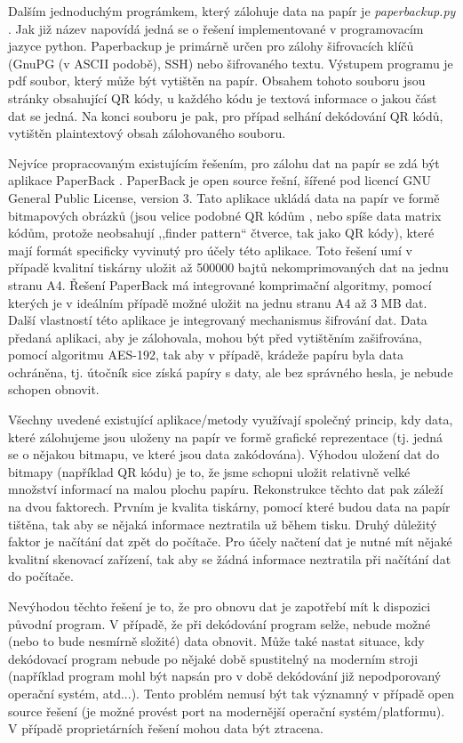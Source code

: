 \documentclass[conference]{IEEEtran}
\begin{document}
Dalším jednoduchým prográmkem, který zálohuje data na papír je \emph{paperbackup.py} \cite{PaperBackup}. Jak již název napovídá jedná se o řešení implementované v programovacím jazyce python. Paperbackup je primárně určen pro zálohy šifrovacích klíčů (GnuPG (v ASCII podobě), SSH) nebo šifrovaného textu. Výstupem programu je pdf soubor, který může být vytištěn na papír. Obsahem tohoto souboru jsou stránky obsahující QR kódy, u každého kódu je textová informace o jakou část dat se jedná. Na konci souboru je pak, pro případ selhání dekódování QR kódů, vytištěn plaintextový obsah zálohovaného souboru. 

Nejvíce propracovaným existujícím řešením, pro zálohu dat na papír se zdá být aplikace PaperBack \cite{PaperBak}. PaperBack je open source řešní, šířené pod licencí GNU General Public License, version 3. Tato aplikace ukládá data na papír ve formě bitmapových obrázků (jsou velice podobné QR kódům \cite{ScanningQrCodes}, nebo spíše data matrix kódům, protože neobsahují ,,finder pattern`` čtverce, tak jako QR kódy), které mají formát specificky vyvinutý pro účely této aplikace. Toto řešení umí v případě kvalitní tiskárny uložit až 500000 bajtů nekomprimovaných dat na jednu stranu A4. Řešení PaperBack má integrované komprimační algoritmy, pomocí kterých je v ideálním případě možné uložit na jednu stranu A4 až 3 MB dat. Další vlastností této aplikace je integrovaný mechanismus šifrování dat. Data předaná aplikaci, aby je zálohovala, mohou být před vytištěním zašifrována, pomocí algoritmu AES-192, tak aby v případě, krádeže papíru byla data ochráněna, tj. útočník sice získá papíry s daty, ale bez správného hesla, je nebude schopen obnovit.

Všechny uvedené existující aplikace/metody využívají společný princip, kdy data, které zálohujeme jsou uloženy na papír ve formě grafické reprezentace (tj. jedná se o nějakou bitmapu, ve které jsou data zakódována). Výhodou uložení dat do bitmapy (například QR kódu) je to, že jsme schopni uložit relativně velké množství informací na malou plochu papíru. Rekonstrukce těchto dat pak záleží na dvou faktorech. Prvním je kvalita tiskárny, pomocí které budou data na papír tištěna, tak aby se nějaká informace neztratila už během tisku. Druhý důležitý faktor je načítání dat zpět do počítače. Pro účely načtení dat je nutné mít nějaké kvalitní skenovací zařízení, tak aby se žádná informace neztratila při načítání dat do počítače. 

Nevýhodou těchto řešení je to, že pro obnovu dat je zapotřebí mít k dispozici původní program. V případě, že při dekódování program selže, nebude možné (nebo to bude nesmírně složité) data obnovit. Může také nastat situace, kdy dekódovací program nebude po nějaké době spustitelný na moderním stroji (například program mohl být napsán pro v době dekódování již nepodporovaný operační systém, atd...). Tento problém nemusí být tak významný v případě open source řešení (je možné provést port na modernější operační systém/platformu). V případě proprietárních řešení mohou data být ztracena.
\end{document}
